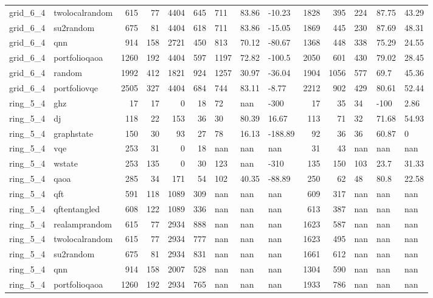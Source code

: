 \begin{longtable}{llrrrrlllrrlll}
grid\_6\_4 & twolocalrandom & 615 & 77 & 4404 & 645 & 711 & 83.86 & -10.23 & 1828 & 395 & 224 & 87.75 & 43.29 \\
grid\_6\_4 & su2random & 675 & 81 & 4404 & 618 & 711 & 83.86 & -15.05 & 1869 & 445 & 230 & 87.69 & 48.31 \\
grid\_6\_4 & qnn & 914 & 158 & 2721 & 450 & 813 & 70.12 & -80.67 & 1368 & 448 & 338 & 75.29 & 24.55 \\
grid\_6\_4 & portfolioqaoa & 1260 & 192 & 4404 & 597 & 1197 & 72.82 & -100.5 & 2050 & 601 & 430 & 79.02 & 28.45 \\
grid\_6\_4 & random & 1992 & 412 & 1821 & 924 & 1257 & 30.97 & -36.04 & 1904 & 1056 & 577 & 69.7 & 45.36 \\
grid\_6\_4 & portfoliovqe & 2505 & 327 & 4404 & 684 & 744 & 83.11 & -8.77 & 2212 & 902 & 429 & 80.61 & 52.44 \\
ring\_5\_4 & ghz & 17 & 17 & 0 & 18 & 72 & nan & -300 & 17 & 35 & 34 & -100 & 2.86 \\
ring\_5\_4 & dj & 118 & 22 & 153 & 36 & 30 & 80.39 & 16.67 & 113 & 71 & 32 & 71.68 & 54.93 \\
ring\_5\_4 & graphstate & 150 & 30 & 93 & 27 & 78 & 16.13 & -188.89 & 92 & 36 & 36 & 60.87 & 0 \\
ring\_5\_4 & vqe & 253 & 31 & 0 & 18 & nan & nan & nan & 31 & 43 & nan & nan & nan \\
ring\_5\_4 & wstate & 253 & 135 & 0 & 30 & 123 & nan & -310 & 135 & 150 & 103 & 23.7 & 31.33 \\
ring\_5\_4 & qaoa & 285 & 34 & 171 & 54 & 102 & 40.35 & -88.89 & 250 & 62 & 48 & 80.8 & 22.58 \\
ring\_5\_4 & qft & 591 & 118 & 1089 & 309 & nan & nan & nan & 609 & 317 & nan & nan & nan \\
ring\_5\_4 & qftentangled & 608 & 122 & 1089 & 336 & nan & nan & nan & 613 & 387 & nan & nan & nan \\
ring\_5\_4 & realamprandom & 615 & 77 & 2934 & 888 & nan & nan & nan & 1623 & 587 & nan & nan & nan \\
ring\_5\_4 & twolocalrandom & 615 & 77 & 2934 & 777 & nan & nan & nan & 1623 & 495 & nan & nan & nan \\
ring\_5\_4 & su2random & 675 & 81 & 2934 & 831 & nan & nan & nan & 1661 & 612 & nan & nan & nan \\
ring\_5\_4 & qnn & 914 & 158 & 2007 & 528 & nan & nan & nan & 1304 & 590 & nan & nan & nan \\
ring\_5\_4 & portfolioqaoa & 1260 & 192 & 2934 & 765 & nan & nan & nan & 1933 & 786 & nan & nan & nan \\

\end{longtable}

